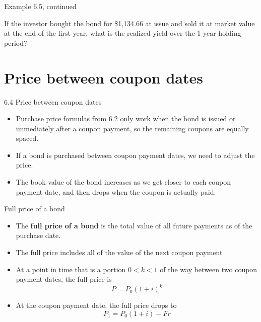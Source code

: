 \documentclass{beamer}
\begin{document}
\begin{frame}{Example 6.5, continued}

If the investor bought the bond for \$1,134.66 at issue and sold it at market value at the end of the first year, what is the realized yield over the 1-year holding period?

\begin{center}
\end{center}

\vfill
\end{frame}

\section{Price between coupon dates}

\begin{frame}{6.4 Price between coupon dates}

\begin{itemize}
\item Purchase price formulas from 6.2 only work when the bond is issued or immediately after a coupon payment, so the remaining coupons are equally spaced.
\item If a bond is purchased between coupon payment dates, we need to adjust the price.
\item The book value of the bond increases as we get closer to each coupon payment date, and then drops when the coupon is actually paid.
\end{itemize}

\end{frame}

\begin{frame}{Full price of a bond}

\begin{itemize}
\item The \textbf{full price of a bond} is the total value of all future payments as of the purchase date.
\item The full price includes all of the value of the next coupon payment
\item At a point in time that is a portion $0 < k < 1$ of the way between two coupon payment dates, the full price is
\[
P = P_0(1+i)^k
\]
\item At the coupon payment date, the full price drops to
\[
P_1 = P_0(1+i) - Fr
\]
\end{itemize}

\end{frame}
\end{document}
